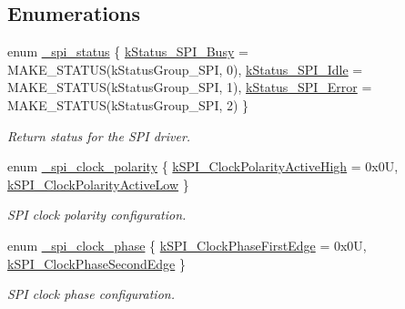 \subsection*{Enumerations}
\begin{DoxyCompactItemize}
\item 
enum \mbox{\hyperlink{group__spi__driver_ga3fa79a6717ea4e1e74de2dadaa468edd}{\+\_\+spi\+\_\+status}} \{ \mbox{\hyperlink{group__spi__driver_gga3fa79a6717ea4e1e74de2dadaa468edda703abdf7900047c4d13536480f3463ab}{k\+Status\+\_\+\+S\+P\+I\+\_\+\+Busy}} = M\+A\+K\+E\+\_\+\+S\+T\+A\+T\+US(k\+Status\+Group\+\_\+\+S\+PI, 0), 
\mbox{\hyperlink{group__spi__driver_gga3fa79a6717ea4e1e74de2dadaa468edda4e32c5b06dccaf4b81e2fd1679e1b560}{k\+Status\+\_\+\+S\+P\+I\+\_\+\+Idle}} = M\+A\+K\+E\+\_\+\+S\+T\+A\+T\+US(k\+Status\+Group\+\_\+\+S\+PI, 1), 
\mbox{\hyperlink{group__spi__driver_gga3fa79a6717ea4e1e74de2dadaa468edda2ff91d774e93aed936b87ffaa18aaf9e}{k\+Status\+\_\+\+S\+P\+I\+\_\+\+Error}} = M\+A\+K\+E\+\_\+\+S\+T\+A\+T\+US(k\+Status\+Group\+\_\+\+S\+PI, 2)
 \}
\begin{DoxyCompactList}\small\item\em Return status for the S\+PI driver. \end{DoxyCompactList}\item 
enum \mbox{\hyperlink{group__spi__driver_ga17f9450af8f63de3fa2b3b105eeec38d}{\+\_\+spi\+\_\+clock\+\_\+polarity}} \{ \mbox{\hyperlink{group__spi__driver_gga17f9450af8f63de3fa2b3b105eeec38da031c0ee2693cf1fd621e8b8cba676629}{k\+S\+P\+I\+\_\+\+Clock\+Polarity\+Active\+High}} = 0x0U, 
\mbox{\hyperlink{group__spi__driver_gga17f9450af8f63de3fa2b3b105eeec38dacfc8257079c9604086622df6de326aea}{k\+S\+P\+I\+\_\+\+Clock\+Polarity\+Active\+Low}}
 \}
\begin{DoxyCompactList}\small\item\em S\+PI clock polarity configuration. \end{DoxyCompactList}\item 
enum \mbox{\hyperlink{group__spi__driver_ga76b6ec98408fdaf2e9133952eefa1baa}{\+\_\+spi\+\_\+clock\+\_\+phase}} \{ \mbox{\hyperlink{group__spi__driver_gga76b6ec98408fdaf2e9133952eefa1baaad15d61c6fd642f13101edbf401d0c72e}{k\+S\+P\+I\+\_\+\+Clock\+Phase\+First\+Edge}} = 0x0U, 
\mbox{\hyperlink{group__spi__driver_gga76b6ec98408fdaf2e9133952eefa1baaa18a98985c1f7dd56175e4a2724db3675}{k\+S\+P\+I\+\_\+\+Clock\+Phase\+Second\+Edge}}
 \}
\begin{DoxyCompactList}\small\item\em S\+PI clock phase configuration. \end{DoxyCompactList}\item 

\end{DoxyCompactItemize}

